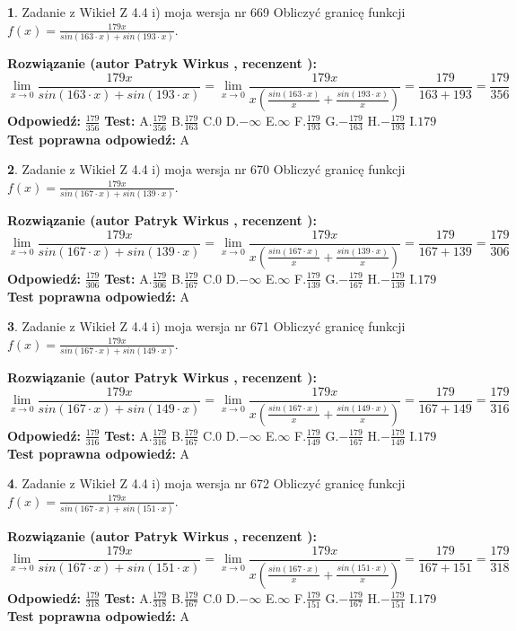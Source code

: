 \documentclass[12pt, a4paper]{article}
\theoremstyle{definition} %
\newtheorem{zad}{}
\newcommand{\zadStart}[1]{\begin{zad}#1\newline}
\newcommand{\zadStop}{\end{zad}}
\newcommand{\rozwStart}[2]{\noindent \textbf{Rozwiązanie (autor #1 , recenzent #2): }\newline}
\newcommand{\rozwStop}{\newline}
\newcommand{\odpStart}{\noindent \textbf{Odpowiedź:}\newline}
\newcommand{\odpStop}{\newline}
\newcommand{\testStart}{\noindent \textbf{Test:}\newline}
\newcommand{\testStop}{\newline}
\newcommand{\kluczStart}{\noindent \textbf{Test poprawna odpowiedź:}\newline}
\newcommand{\kluczStop}{\newline}
\begin{document}
\zadStart{Zadanie z Wikieł Z 4.4 i) moja wersja nr 669}
Obliczyć granicę funkcji $f(x)=\frac{179x}{sin(163\cdot x) +sin(193\cdot x)}$.
\zadStop
\rozwStart{Patryk Wirkus}{}
$$\lim\limits_{x\to 0}\frac{179x}{sin(163\cdot x) +sin(193\cdot x)}=\lim\limits_{x\to 0}\frac{179x}{x(\frac{sin(163\cdot x)}{x}+\frac{sin(193\cdot x)}{x})}=\frac{179}{163+193} = \frac{179}{356}$$
\rozwStop
\odpStart
$\frac{179}{356}$
\odpStop
\testStart
A.$\frac{179}{356}$
B.$\frac{179}{163}$
C.$0$
D.$-\infty$
E.$\infty$
F.$\frac{179}{193}$
G.$-\frac{179}{163}$
H.$-\frac{179}{193}$
I.$179$
\testStop
\kluczStart
A
\kluczStop



\zadStart{Zadanie z Wikieł Z 4.4 i) moja wersja nr 670}
Obliczyć granicę funkcji $f(x)=\frac{179x}{sin(167\cdot x) +sin(139\cdot x)}$.
\zadStop
\rozwStart{Patryk Wirkus}{}
$$\lim\limits_{x\to 0}\frac{179x}{sin(167\cdot x) +sin(139\cdot x)}=\lim\limits_{x\to 0}\frac{179x}{x(\frac{sin(167\cdot x)}{x}+\frac{sin(139\cdot x)}{x})}=\frac{179}{167+139} = \frac{179}{306}$$
\rozwStop
\odpStart
$\frac{179}{306}$
\odpStop
\testStart
A.$\frac{179}{306}$
B.$\frac{179}{167}$
C.$0$
D.$-\infty$
E.$\infty$
F.$\frac{179}{139}$
G.$-\frac{179}{167}$
H.$-\frac{179}{139}$
I.$179$
\testStop
\kluczStart
A
\kluczStop



\zadStart{Zadanie z Wikieł Z 4.4 i) moja wersja nr 671}
Obliczyć granicę funkcji $f(x)=\frac{179x}{sin(167\cdot x) +sin(149\cdot x)}$.
\zadStop
\rozwStart{Patryk Wirkus}{}
$$\lim\limits_{x\to 0}\frac{179x}{sin(167\cdot x) +sin(149\cdot x)}=\lim\limits_{x\to 0}\frac{179x}{x(\frac{sin(167\cdot x)}{x}+\frac{sin(149\cdot x)}{x})}=\frac{179}{167+149} = \frac{179}{316}$$
\rozwStop
\odpStart
$\frac{179}{316}$
\odpStop
\testStart
A.$\frac{179}{316}$
B.$\frac{179}{167}$
C.$0$
D.$-\infty$
E.$\infty$
F.$\frac{179}{149}$
G.$-\frac{179}{167}$
H.$-\frac{179}{149}$
I.$179$
\testStop
\kluczStart
A
\kluczStop



\zadStart{Zadanie z Wikieł Z 4.4 i) moja wersja nr 672}
Obliczyć granicę funkcji $f(x)=\frac{179x}{sin(167\cdot x) +sin(151\cdot x)}$.
\zadStop
\rozwStart{Patryk Wirkus}{}
$$\lim\limits_{x\to 0}\frac{179x}{sin(167\cdot x) +sin(151\cdot x)}=\lim\limits_{x\to 0}\frac{179x}{x(\frac{sin(167\cdot x)}{x}+\frac{sin(151\cdot x)}{x})}=\frac{179}{167+151} = \frac{179}{318}$$
\rozwStop
\odpStart
$\frac{179}{318}$
\odpStop
\testStart
A.$\frac{179}{318}$
B.$\frac{179}{167}$
C.$0$
D.$-\infty$
E.$\infty$
F.$\frac{179}{151}$
G.$-\frac{179}{167}$
H.$-\frac{179}{151}$
I.$179$
\testStop
\kluczStart
A
\kluczStop
\end{document}
